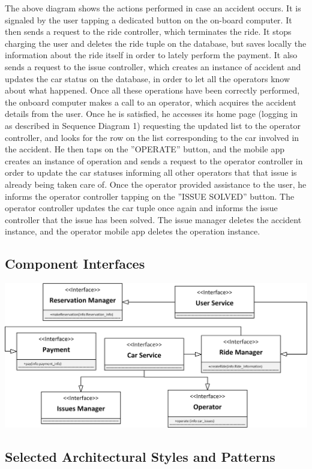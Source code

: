 \documentclass{article}
\begin{document}
\begin{flushleft}
The above diagram shows the actions performed in case an accident occurs. It is signaled by the user tapping a dedicated button on the on-board computer. It then sends a request to the ride controller, which terminates the ride. It stops charging the user and deletes the ride tuple on the database, but saves locally the information about the ride itself in order to lately perform the payment. It also sends a request to the issue controller, which creates an instance of accident and updates the car status on the database, in order to let all the operators know about what happened. Once all these operations have been correctly performed, the onboard computer makes a call to an operator, which acquires the accident details from the user. Once he is satisfied, he accesses its home page (logging in as described in Sequence Diagram 1) requesting the updated list to the operator controller, and looks for the row on the list corresponding to the car involved in the accident. He then taps on the ''OPERATE'' button, and the mobile app creates an instance of operation and sends a request to the operator controller in order to update the car statuses informing all other operators that that issue is already being taken care of. Once the operator provided assistance to the user, he informs the operator controller tapping on the ''ISSUE SOLVED'' button. The operator controller updates the car tuple once again and informs the issue controller that the issue has been solved. The issue manager deletes the accident instance, and the operator mobile app deletes the operation instance.


\newpage

\subsection{Component Interfaces} %
\includegraphics[scale=0.25]{interface} 

\subsection{Selected Architectural Styles and Patterns} %

\end{flushleft}
\end{document}
